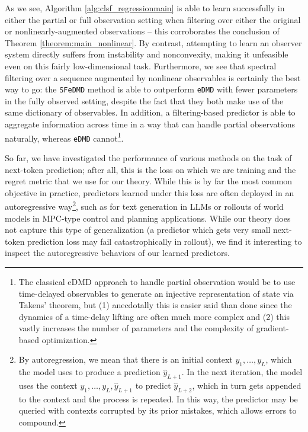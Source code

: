 \documentclass[11pt]{article}
\numberwithin{equation}{section}
\begin{document}
As we see, Algorithm \ref{alg:clsf_regressionmain} is able to learn successfully in either the partial or full observation setting when filtering over either the original or nonlinearly-augmented observations -- this corroborates the conclusion of Theorem \ref{theorem:main_nonlinear}. By contrast, attempting to learn an observer system directly suffers from instability and nonconvexity, making it unfeasible even on this fairly low-dimensional task. Furthermore, we see that spectral filtering over a sequence augmented by nonlinear observables is certainly the best way to go: the \verb|SFeDMD| method is able to outperform \verb|eDMD| with fewer parameters in the fully observed setting, despite the fact that they both make use of the same dictionary of observables. In addition, a filtering-based predictor is able to aggregate information across time in a way that can handle partial observations naturally, whereas \verb|eDMD| cannot\footnote{The classical eDMD approach to handle partial observation would be to use time-delayed observables to generate an injective representation of state via Takens' theorem, but (1) anecdotally this is easier said than done since the dynamics of a time-delay lifting are often much more complex and (2) this vastly increases the number of parameters and the complexity of gradient-based optimization.}. 

So far, we have investigated the performance of various methods on the task of next-token prediction; after all, this is the loss on which we are training and the regret metric that we use for our theory. While this is by far the most common objective in practice, predictors learned under this loss are often deployed in an autoregressive way\footnote{By autoregression, we mean that there is an initial context $y_1, \ldots, y_L$, which the model uses to produce a prediction $\hat{y}_{L+1}$. In the next iteration, the model uses the context $y_1, \ldots, y_L, \hat{y}_{L+1}$ to predict $\hat{y}_{L+2}$, which in turn gets appended to the context and the process is repeated. In this way, the predictor may be queried with contexts 
corrupted by its prior mistakes, which allows
errors to compound.}, such as for text generation in LLMs or rollouts of world models in MPC-type control and planning applications. While our theory does not capture this type of generalization (a predictor which gets very small next-token prediction loss may fail catastrophically in rollout), we find it interesting to inspect the autoregressive behaviors of our learned predictors. 
\end{document}
